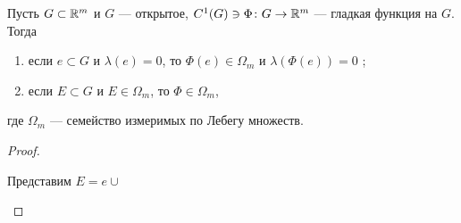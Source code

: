 \begin{thm}
    Пусть $ G \subset \mathbb{R}^{m}$ и $ G$ --- открытое,  $ C^{1}(G) \ni \Phi\colon G \to \mathbb{R}^{m} $ --- гладкая функция на $ G$.
    Тогда
     \begin{enumerate}[noitemsep,label=(\arabic*),noitemsep]
	 \item  если  $ e \subset G$ и $ \lambda (e) = 0$, то $ \Phi(e) \in \Omega _{m}$ и $ \lambda (\Phi(e)) = 0$ ;
        \item если $ E \subset G$ и $ E \in \Omega _{m}$, то $ \Phi \in \Omega _{m}$,
    \end{enumerate} 
    где $ \Omega _{m}$ --- семейство измеримых по Лебегу множеств.
\end{thm}
\begin{proof}
    $ $
    \begin{description}
        \item {} 
	    Представим $ E = e \cup $
        \item {} 
    \end{description} 
\end{proof}

